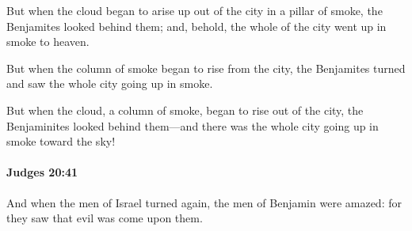 			\begin{versebox}
					\item[BHS] 
					\item[ASV] But when the cloud began to arise up out of the city in a pillar of smoke, the Benjamites looked behind them; and, behold, the whole of the city went up in smoke to heaven.
					\item[NIV] But when the column of smoke began to rise from the city, the Benjamites turned and saw the whole city going up in smoke.
					\item[NRSV] But when the cloud, a column of smoke, began to rise out of the city, the Benjaminites looked behind them—and there was the whole city going up in smoke toward the sky!
			\end{versebox}

		\paragraph{Judges 20:41} %
			\label{JUDGES-20-41}

			And when the men of Israel turned again, the men of Benjamin were amazed: for they saw that evil was come upon them.

